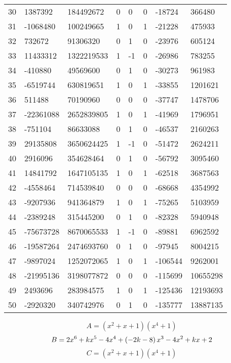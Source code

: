 \documentclass{amsart}
\begin{document}
\begin{longtable}{|l|l|l|lllll|}
30&1387392&184492672&0&0&0&-18724&366480\\
31&-1068480&100249665&1&0&1&-21228&475933\\
32&732672&91306320&0&1&0&-23976&605124\\
33&11433312&1322219533&1&-1&0&-26986&783255\\
34&-410880&49569600&0&1&0&-30273&961983\\
35&-6519744&630819651&1&0&1&-33855&1201621\\
36&511488&70190960&0&0&0&-37747&1478706\\
37&-22361088&2652839805&1&0&1&-41969&1796951\\
38&-751104&86633088&0&1&0&-46537&2160263\\
39&29135808&3650624425&1&-1&0&-51472&2624211\\
40&2916096&354628464&0&1&0&-56792&3095460\\
41&14841792&1647105135&1&0&1&-62518&3687563\\
42&-4558464&714539840&0&0&0&-68668&4354992\\
43&-9207936&941364879&1&0&1&-75265&5103959\\
44&-2389248&315445200&0&1&0&-82328&5940948\\
45&-75673728&8670065533&1&-1&0&-89881&6962592\\
46&-19587264&2474693760&0&1&0&-97945&8004215\\
47&-9897024&1252072065&1&0&1&-106544&9262001\\
48&-21995136&3198077872&0&0&0&-115699&10655298\\
49&2493696&283984575&1&0&1&-125436&12193693\\
50&-2920320&340742976&0&1&0&-135777&13887135\\
\hline
\end{longtable}
$$A=(x^2
 + x
 + 1)(x^4
 + 1)$$
$$B=2\*x^6
 + k\*x^5
 - 4\*x^4
 + \left(-2\*k
 - 8\right) \*x^3
 - 4\*x^2
 + k\*x
 + 2$$
$$C=(x^2
 + x
 + 1)(x^4
 + 1)$$
\end{document}
